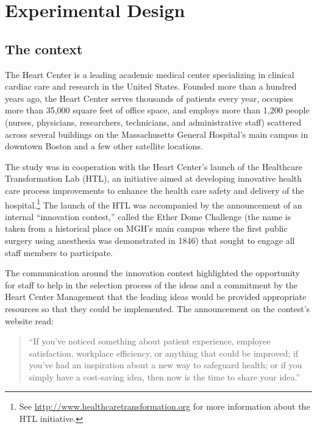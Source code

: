 \documentclass[12pt, titlepage]{article}
\begin{document}
\section{Experimental Design}\label{experimental-design}

\subsection{The context}\label{the-context}

The Heart Center is a leading academic medical center specializing in
clinical cardiac care and research in the United States. Founded more
than a hundred years ago, the Heart Center serves thousands of patients
every year, occupies more than 35,000 square feet of office space, and
employs more than 1,200 people (nurses, physicians, researchers,
technicians, and administrative staff) scattered across several
buildings on the Massachusetts General Hospital's main campus in
downtown Boston and a few other satellite locations.

The study was in cooperation with the Heart Center's launch of the
Healthcare Transformation Lab (HTL), an initiative aimed at developing
innovative health care process improvements to enhance the health care
safety and delivery of the hospital.\footnote{See
  \url{http://www.healthcaretransformation.org} for more information
  about the HTL initiative.} The launch of the HTL was accompanied by
the announcement of an internal ``innovation contest,'' called the Ether
Dome Challenge (the name is taken from a historical place on MGH's main
campus where the first public surgery using anesthesia was demonstrated
in 1846) that sought to engage all staff members to participate.

The communication around the innovation contest highlighted the
opportunity for staff to help in the selection process of the ideas and
a commitment by the Heart Center Management that the leading ideas would
be provided appropriate resources so that they could be implemented. The
announcement on the contest's website read:

\begin{quote}
``If you've noticed something about patient experience, employee
satisfaction, workplace efficiency, or anything that could be improved;
if you've had an inspiration about a new way to safeguard health; or if
you simply have a cost-saving idea, then now is the time to share your
idea.''
\end{quote}
\end{document}
